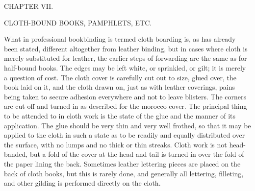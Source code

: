 \documentclass[twoside]{book}
\begin{document}
\vspace*{\fill}

\pagebreak


\thispagestyle{empty}

\vspace*{\fill}

\begin{center}

\begin{large}CHAPTER VII.\end{large}

\begin{small}CLOTH-BOUND BOOKS, PAMPHLETS, ETC.\end{small}

\end{center}

\noindent
What in professional bookbinding is termed cloth
boarding is, as has already been stated, different
altogether from leather binding, but in cases where
cloth is merely substituted for leather, the earlier
steps of forwarding are the same as for half-bound
books. The edges may be left white, or sprinkled,
or gilt; it is merely a question of cost. The cloth
cover is carefully cut out to size, glued over, the
book laid on it, and the cloth drawn on, just as with
leather coverings, pains being taken to secure
adhesion everywhere and not to leave blisters. The
corners are cut off and turned in as described
for the morocco cover. The principal thing to be
attended to in cloth work is the state of the glue
and the manner of its application. The glue should
be very thin and very well frothed, so that it may be
applied to the cloth in such a state as to be readily
and equally distributed over the surface, with no
lumps and no thick or thin streaks. Cloth work
is not head-banded, but a fold of the cover at the
head and tail is turned in over the fold of the paper
lining the back. Sometimes leather lettering pieces
are placed on the back of cloth books, but this is
rarely done, and generally all lettering, filleting, and
other gilding is performed directly on the cloth.
\end{document}
